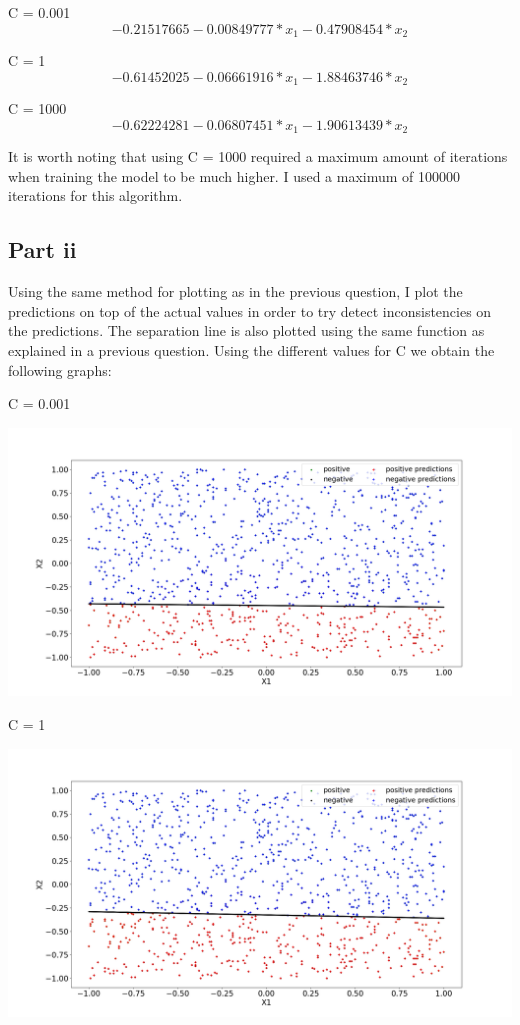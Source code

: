 \documentclass[10pt]{article}
\begin{document}
C = 0.001
\begin{equation*}
    -0.21517665 - 0.00849777 * x_{1} - 0.47908454 * x_{2}
\end{equation*}

C = 1
\begin{equation*}
    -0.61452025 - 0.06661916 * x_{1} - 1.88463746 * x_{2}
\end{equation*}

C = 1000
\begin{equation*}
    -0.62224281 - 0.06807451 * x_{1} - 1.90613439 * x_{2}
\end{equation*}



It is worth noting that using C = 1000 required a maximum amount of iterations
when training the model to be much higher. I used a maximum of 100000 iterations
for this algorithm.

\subsection*{Part ii}
Using the same method for plotting as in the previous question,
I plot the predictions on top of the actual values in order to try
detect inconsistencies on the predictions. The separation
line is also plotted using the same function as explained
in a previous question. Using the different values for C we
obtain the following graphs:

C = 0.001

\includegraphics[scale=0.245]{Figure_C_0001.png}

C = 1

\includegraphics[scale=0.245]{Figure_C_1.png}
\end{document}
